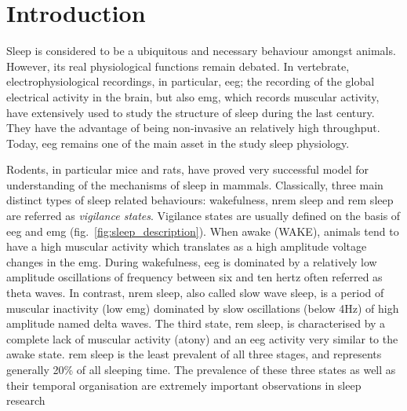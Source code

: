 \section{Introduction} \label{intro}

Sleep is considered to be a ubiquitous and necessary behaviour amongst
animals\cite{siegel_all_2008,cirelli_is_2008}.
However, its real physiological functions remain debated.
In vertebrate, electrophysiological recordings, in particular, \gls{eeg};
the recording of the global electrical activity in the brain,
but also \gls{emg}, which records muscular activity,
have extensively used to study the structure of sleep during the last
century\cite{loomis_distribution_1938,aserinsky_regularly_1953}.
They have the advantage of being non-invasive an relatively high throughput.
Today, \gls{eeg} remains one of the main asset in the study sleep physiology.

Rodents, in particular mice and rats, have proved very successful model for
understanding of the mechanisms of sleep in mammals\cite{toth_animal_2013}.
Classically, three main distinct types of sleep related behaviours: wakefulness, \gls{nrem} sleep and \gls{rem} 
sleep are referred as \emph{vigilance states}.
Vigilance states are usually defined on the basis of \gls{eeg} and \gls{emg} (fig.~\ref{fig:sleep_description}).
When awake (WAKE), animals tend to have a high muscular activity which translates as a high amplitude voltage changes in the \gls{emg}.
During wakefulness, \gls{eeg} is dominated by a relatively low amplitude oscillations of frequency
between six and ten hertz often referred as theta waves.
In contrast, \gls{nrem} sleep, also called slow wave sleep, is a period of muscular inactivity (low \gls{emg})
dominated by slow oscillations (below 4Hz) of high amplitude named delta waves.
The third state, \gls{rem} sleep, is characterised by a complete lack of muscular activity (atony) and an \gls{eeg} activity very similar to the awake state.
\gls{rem} sleep is the least prevalent of all three stages, and represents generally  20\% of all sleeping time.
The prevalence of these three states as well as their temporal organisation are extremely important observations in sleep research




